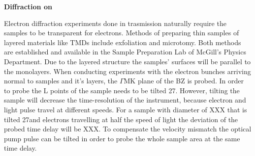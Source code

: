 \textbf{Diffraction on \ts}

Electron diffraction experiments done in trasmission naturally require the samples to be transparent for electrons.
Methods of preparing thin samples of layered materials like \acp{TMD} include exfoliation\cite{exf} and microtomy\cite{micro}.
Both methods are established and available in the Sample Preparation Lab of McGill's Physics Department.
Due to the layered structure the samples' surfaces will be parallel to the monolayers.
When conducting experiments with the electron bunches arriving normal to \ts\space samples and it's layers, the $\Gamma\mathrm{MK}$ plane of the \ac{BZ} is probed.
In order to probe the L points of \ts\space the sample needs to be tilted 27\textdegree.
However, tilting the sample will decrease the time-resolution of the instrument, because electron and light pulse travel at different speeds.
For a sample with diameter of XXX that is tilted 27\textdegree and electrons travelling at half the speed of light the deviation of the probed time delay will be XXX.
To compensate the velocity mismatch the optical pump pulse can be tilted in order to probe the whole sample area at the same time delay\cite{baum2006}.